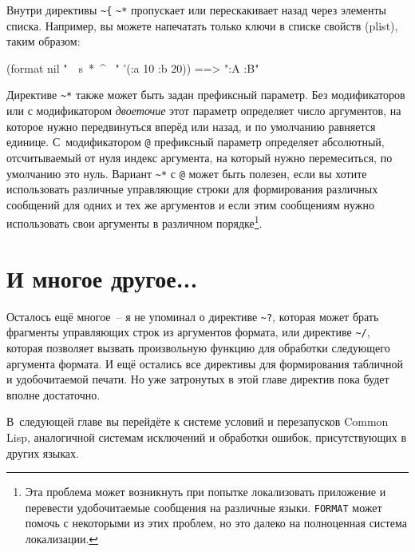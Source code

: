 Внутри директивы \lstinline!~{! \lstinline!~*! пропускает или перескакивает назад через элементы списка. Например, вы можете
напечатать только ключи в списке свойств (plist), таким образом:

\begin{myverb}
(format nil "~{~s~*~^ ~}" '(:a 10 :b 20)) ==> ":A :B"
\end{myverb}

Директиве \lstinline!~*! также может быть задан префиксный параметр. Без модификаторов или
с модификатором \textit{двоеточие} этот параметр определяет число аргументов, на которое
нужно передвинуться вперёд или назад, и по умолчанию равняется единице. С~модификатором
\lstinline!@! префиксный параметр определяет абсолютный, отсчитываемый от нуля индекс
аргумента, на который нужно перемеситься, по умолчанию это нуль. Вариант \lstinline!~*! с
\lstinline!@! может быть полезен, если вы хотите использовать различные управляющие строки
для формирования различных сообщений для одних и тех же аргументов и если этим сообщениям
нужно использовать свои аргументы в различном порядке\footnote{Эта проблема может
  возникнуть при попытке локализовать приложение и перевести удо\-бо\-чи\-тае\-мые сообщения на
  различные языки. \lstinline{FORMAT} может помочь с некоторыми из этих проблем, но это далеко
  на полноценная система локализации.}\hspace{\footnotenegspace}.

\section{И многое другое...}

Осталось ещё многое~-- я не упоминал о директиве \lstinline!~?!, которая может брать
фрагменты управляющих строк из аргументов формата, или директиве \lstinline!~/!, которая
позволяет вызвать произвольную функцию для обработки следующего аргумента формата. И ещё
остались все директивы для формирования табличной и удобочитаемой печати. Но уже
затронутых в этой главе директив пока будет вполне достаточно.

В~следующей главе вы перейдёте к системе условий и перезапусков Common Lisp, аналогичной системам
исключений и обработки ошибок, присутствующих в других языках.



